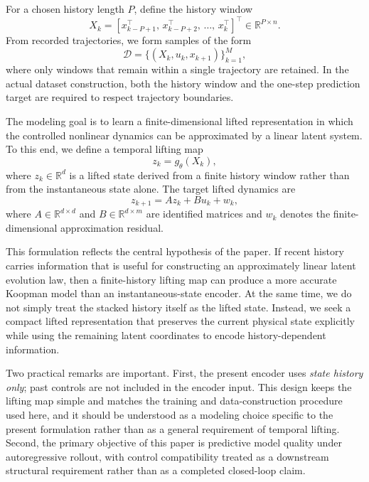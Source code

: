 \documentclass[journal]{IEEEtran}
\begin{document}
For a chosen history length $P$, define the history window
\begin{equation}
    X_k = [x_{k-P+1}^\top,\,x_{k-P+2}^\top,\,\ldots,\,x_k^\top]^\top \in \mathbb{R}^{P\times n}.
    \label{eq:history_window}
\end{equation}
From recorded trajectories, we form samples of the form
\begin{equation}
    \mathcal{D} = \{(X_k,u_k,x_{k+1})\}_{k=1}^{M},
    \label{eq:dataset}
\end{equation}
where only windows that remain within a single trajectory are retained. In the actual dataset construction, both the history window and the one-step prediction target are required to respect trajectory boundaries.

The modeling goal is to learn a finite-dimensional lifted representation in which the controlled nonlinear dynamics can be approximated by a linear latent system. To this end, we define a temporal lifting map
\begin{equation}
    z_k = g_\theta(X_k),
    \label{eq:temporal_lifting}
\end{equation}
where $z_k \in \mathbb{R}^d$ is a lifted state derived from a finite history window rather than from the instantaneous state alone. The target lifted dynamics are
\begin{equation}
    z_{k+1} = A z_k + B u_k + w_k,
    \label{eq:lifted_dynamics}
\end{equation}
where $A \in \mathbb{R}^{d\times d}$ and $B \in \mathbb{R}^{d\times m}$ are identified matrices and $w_k$ denotes the finite-dimensional approximation residual.

This formulation reflects the central hypothesis of the paper. If recent history carries information that is useful for constructing an approximately linear latent evolution law, then a finite-history lifting map can produce a more accurate Koopman model than an instantaneous-state encoder. At the same time, we do not simply treat the stacked history itself as the lifted state. Instead, we seek a compact lifted representation that preserves the current physical state explicitly while using the remaining latent coordinates to encode history-dependent information.

Two practical remarks are important. First, the present encoder uses \emph{state history only}; past controls are not included in the encoder input. This design keeps the lifting map simple and matches the training and data-construction procedure used here, and it should be understood as a modeling choice specific to the present formulation rather than as a general requirement of temporal lifting. Second, the primary objective of this paper is predictive model quality under autoregressive rollout, with control compatibility treated as a downstream structural requirement rather than as a completed closed-loop claim.
\end{document}
